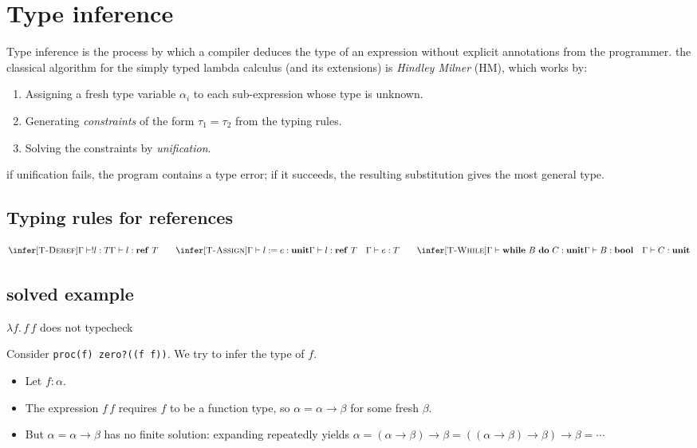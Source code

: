\section{Type inference}
Type inference is the process by which a compiler deduces the type of an expression without explicit annotations from the programmer. the classical algorithm for the simply typed lambda calculus (and its extensions) is \emph{Hindley Milner} (HM), which works by:

\begin{enumerate}
  \item Assigning a fresh type variable $\alpha_i$ to each sub-expression
        whose type is unknown.
  \item Generating \emph{constraints} of the form $\tau_1 = \tau_2$ from the
        typing rules.
  \item Solving the constraints by \emph{unification}.
\end{enumerate}

if unification fails, the program contains a type error; if it succeeds, the resulting substitution gives the most general type.

\subsection{Typing rules for references}
\[
\infer[\textsc{T-Deref}]
  {\Gamma \vdash \deref{l} : T}
  {\Gamma \vdash l : \tref{T}}
\qquad
\infer[\textsc{T-Assign}]
  {\Gamma \vdash \assign{l}{e} : \unit}
  {\Gamma \vdash l : \tref{T} \quad \Gamma \vdash e : T}
\qquad
\infer[\textsc{T-While}]
  {\Gamma \vdash \whiledo{B}{C} : \unit}
  {\Gamma \vdash B : \tybool \quad \Gamma \vdash C : \unit}
\]
\subsection{solved example}
$\lambda f.\, f\, f$ does not typecheck

Consider \lstinline|proc(f) zero?((f f))|.  We try to infer the type of $f$.
 
\begin{itemize}
  \item Let $f : \alpha$.
  \item The expression $f\, f$ requires $f$ to be a function type, so
        $\alpha = \alpha \to \beta$ for some fresh $\beta$.
  \item But $\alpha = \alpha \to \beta$ has no finite solution: expanding
        repeatedly yields $\alpha = (\alpha \to \beta) \to \beta =
        ((\alpha\to\beta)\to\beta)\to\beta = \cdots$
\end{itemize}

